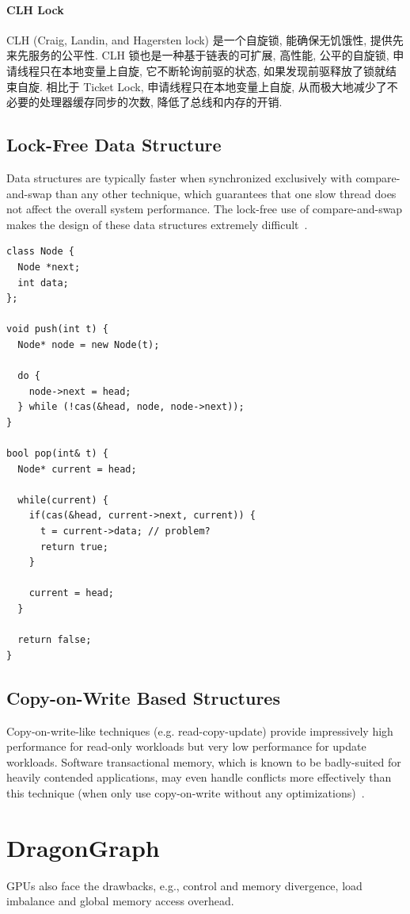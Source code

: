 \documentclass[UTF8,12pt,a4paper]{article}
\begin{document}
\paragraph{CLH Lock}
CLH (Craig, Landin, and Hagersten lock) 是一个自旋锁, 能确保无饥饿性, 提供先来先服务的公平性.
CLH 锁也是一种基于链表的可扩展, 高性能, 公平的自旋锁,
申请线程只在本地变量上自旋, 它不断轮询前驱的状态, 如果发现前驱释放了锁就结束自旋.
相比于 Ticket Lock, 申请线程只在本地变量上自旋,
从而极大地减少了不必要的处理器缓存同步的次数, 降低了总线和内存的开销.
\subsection{Lock-Free Data Structure}
Data structures are typically faster when synchronized exclusively
with compare-and-swap than any other technique,
which guarantees that one slow thread does not affect the overall system performance.
The lock-free use of compare-and-swap makes
the design of these data structures extremely difficult~\cite{DBLP:conf/ppopp/Gramoli15}.
\begin{lstlisting}
class Node {
  Node *next;
  int data;
}; 

void push(int t) {
  Node* node = new Node(t);

  do {
    node->next = head;
  } while (!cas(&head, node, node->next));
}

bool pop(int& t) {
  Node* current = head;

  while(current) {
    if(cas(&head, current->next, current)) {
      t = current->data; // problem?
      return true;
    }

    current = head;
  }

  return false;
}
\end{lstlisting}
\subsection{Copy-on-Write Based Structures}
Copy-on-write-like techniques (e.g. read-copy-update)
provide impressively high performance for read-only workloads
but very low performance for update workloads.
Software transactional memory,
which is known to be badly-suited for heavily contended applications,
may even handle conflicts more effectively than this technique
(when only use copy-on-write without any optimizations)~\cite{DBLP:conf/ppopp/Gramoli15}.
\clearpage

\section{DragonGraph}
GPUs also face the drawbacks,
e.g., control and memory divergence,
load imbalance and global memory access overhead.
\end{document}
